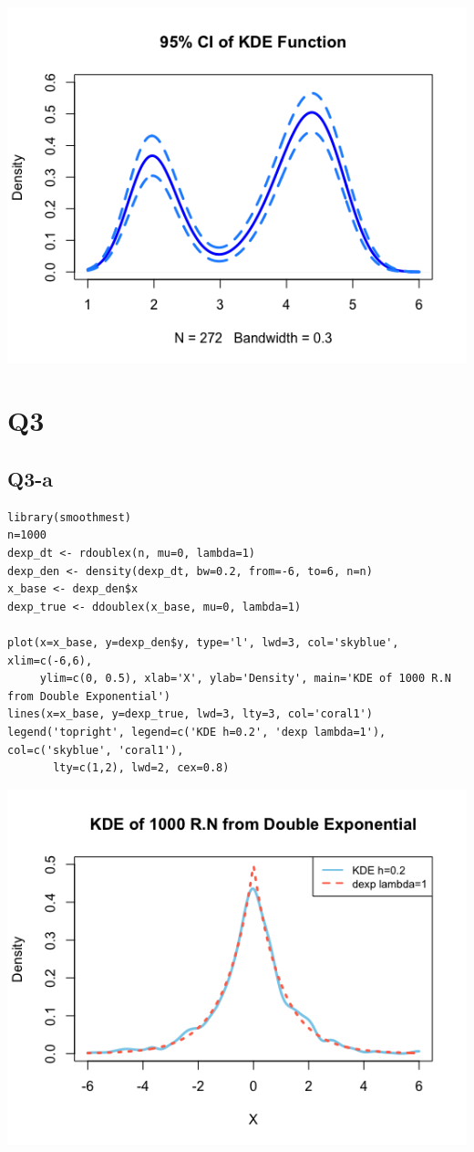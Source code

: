 \documentclass[12pt,letterpaper]{article}
\begin{document}
\includegraphics[scale=0.7]{q2-c.png}

\section*{Q3}
\subsection*{Q3-a}
\begin{verbatim}
library(smoothmest)
n=1000
dexp_dt <- rdoublex(n, mu=0, lambda=1)
dexp_den <- density(dexp_dt, bw=0.2, from=-6, to=6, n=n)
x_base <- dexp_den$x
dexp_true <- ddoublex(x_base, mu=0, lambda=1)

plot(x=x_base, y=dexp_den$y, type='l', lwd=3, col='skyblue', xlim=c(-6,6), 
     ylim=c(0, 0.5), xlab='X', ylab='Density', main='KDE of 1000 R.N from Double Exponential')
lines(x=x_base, y=dexp_true, lwd=3, lty=3, col='coral1')
legend('topright', legend=c('KDE h=0.2', 'dexp lambda=1'), col=c('skyblue', 'coral1'), 
       lty=c(1,2), lwd=2, cex=0.8)
\end{verbatim}
\includegraphics[scale=0.7]{q3-a.png}
\end{document}
